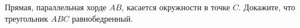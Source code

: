 \begin{ex}
	\begin{condition}
		Прямая, параллельная хорде \( AB \), касается окружности в точке \( C \). Докажите, что треугольник \( ABC \) равнобедренный.
	\end{condition}
\end{ex}